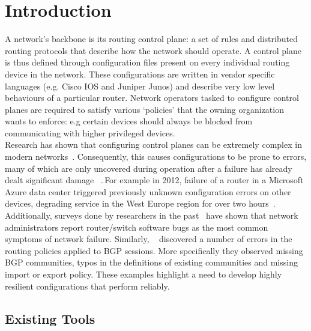 \documentclass[../thesis.tex]{subfiles}
\begin{document}
\chapter{Introduction}
\label{ch:intro}

A network's backbone is its routing control plane: a set of rules and distributed routing protocols that describe how the network should operate. A control plane is thus defined through configuration files present on every individual routing device in the network. These configurations are written in vendor specific languages (e.g. Cisco IOS and Juniper Junos) and describe very low level behaviours of a particular router. Network operators tasked to configure control planes are required to satisfy various `policies' that the owning organization wants to enforce: e.g certain devices should always be blocked from communicating with higher privileged devices.\\

Research has shown that configuring control planes can be extremely complex in modern networks~\cite{complexity}. Consequently, this causes configurations to be prone to errors, many of which are only uncovered during operation after a failure has already dealt significant damage ~\cite{errors}. For example in 2012, failure of a router in a Microsoft Azure data center triggered previously unknown configuration errors on other devices, degrading service in the West Europe region for over two hours~\cite{azure}. Additionally, surveys done by researchers in the past~\cite{Zeng} have shown that network administrators report router/switch software bugs as the most common symptoms of network failure. Similarly, ~\cite{Lee} discovered a number of errors in the routing policies applied to BGP sessions. More specifically they observed missing BGP communities, typos in the definitions of existing communities and missing import or export policy. These examples highlight a need to develop highly resilient configurations that perform reliably.\\  


\section{Existing Tools}
\end{document}
